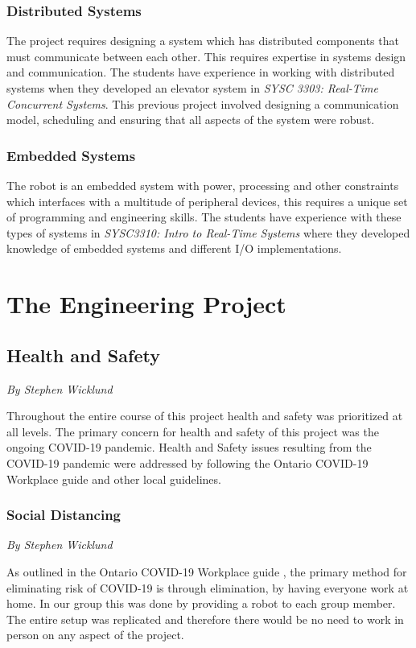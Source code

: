 \documentclass[12pt]{report}
\newcommand{\sectionAuthor}[1]{{\small\vspace{-1em}\textit{#1}}\bigskip\par}
\begin{document}
\subsection{Distributed Systems}
The project requires designing a system which has distributed components that must communicate between each other. This requires expertise in systems design and communication. The students have experience in working with distributed systems when they developed an elevator system in \textit{SYSC 3303: Real-Time Concurrent Systems}. This previous project involved designing a communication model, scheduling and ensuring that all aspects of the system were robust.

\subsection{Embedded Systems}
The robot is an embedded system with power, processing and other constraints which interfaces with a multitude of peripheral devices, this requires a unique set of programming and engineering skills. The students have experience with these types of systems in \textit{SYSC3310: Intro to Real-Time Systems} where they developed knowledge of embedded systems and different I/O implementations.
\chapter{The Engineering Project}
\section{Health and Safety}
\sectionAuthor{By Stephen Wicklund}
Throughout the entire course of this project health and safety was prioritized at all levels. The primary concern for health and safety of this project was the ongoing COVID-19 pandemic. Health and Safety issues resulting from the COVID-19 pandemic were addressed by following the Ontario COVID-19 Workplace guide \cite{OntarioCovidPlan} and other local guidelines.
\subsection{Social Distancing}
\sectionAuthor{By Stephen Wicklund}
As outlined in the Ontario COVID-19 Workplace guide \cite{OntarioCovidPlan}, the primary method for eliminating risk of COVID-19 is through elimination, by having everyone work at home. In our group this was done by providing a robot to each group member. The entire setup was replicated and therefore there would be no need to work in person on any aspect of the project.
\end{document}
